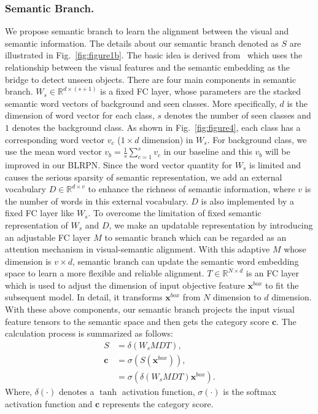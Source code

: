 \documentclass[runningheads]{llncs}
\begin{document}
\subsubsection{Semantic Branch.\label{Semantic Branch}}
We propose semantic branch to learn the alignment between the visual and semantic information. The details about our semantic branch denoted as $S$ are illustrated in Fig.~\ref{fig:figure1b}. The basic idea is derived from~\cite{rahman2020improved} which uses the relationship between the visual features and the semantic embedding as the bridge to detect unseen objects. There are four main components in semantic branch. $W_{s} \in \mathbb{R}^{d \times (s+1)}$ is a fixed FC layer, whose parameters are the stacked semantic word vectors of background and seen classes. More specifically, $d$ is the dimension of word vector for each class, $s$ denotes the number of seen classes and $1$ denotes the background class. As shown in Fig.~\ref{fig:figure4}, each class has a corresponding word vector $v_c$ ($1 \times d$ dimension) in $W_{s}$. For background class, we use the mean word vector $v_b = \frac{1}{s}\sum_{c=1}^{s}{v_c}$ in our baseline and this $v_b$ will be improved in our BLRPN. Since the word vector quantity for $W_{s}$ is limited and causes the serious sparsity of semantic representation, we add an external vocabulary $D \in \mathbb{R}^{d \times v}$ to enhance the richness of semantic information, where $v$ is the number of words in this external vocabulary. $D$ is also implemented by a fixed FC layer like $W_s$. To overcome the limitation of fixed semantic representation of $W_{s}$ and $D$, we make an updatable representation by introducing an adjustable FC layer $M$ to semantic branch which can be regarded as an attention mechanism in visual-semantic alignment. With this adaptive $M$ whose dimension is $v \times d$, semantic branch can update the semantic word embedding space to learn a more flexible and reliable alignment. $T \in \mathbb{R}^{N \times d}$ is an FC layer which is used to adjust the dimension of input objective feature $\mathbf{x}^{box}$ to fit the subsequent model. In detail, it transforms $\mathbf{x}^{box}$ from $N$ dimension to $d$ dimension. With these above components, our semantic branch projects the input visual feature tensors to the semantic space and then gets the category score $\mathbf{c}$. The calculation process is summarized as follows: 
\begin{equation}
\begin{split}
    S &= \delta(W_{s}MDT), \\
    \mathbf{c} &= \sigma(S(\mathbf{x}^{box})), \\
               &= \sigma(\delta(W_{s}MDT)\mathbf{x}^{box}). 
\end{split}
\label{con:semantic_branch}
\end{equation}
Where, $\delta(\cdot)$ denotes a $\tanh$ activation function, $\sigma(\cdot)$ is the softmax activation function and $\mathbf{c}$ represents the category score.
\end{document}
